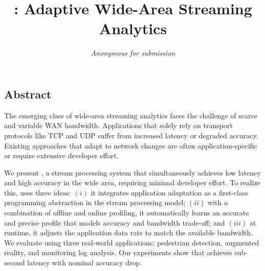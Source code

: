 \documentclass[twocolumn, 9pt]{article}
\begin{document}
\date{}



\title{\sysname{}: Adaptive Wide-Area Streaming Analytics}

\author{
  \textit{Anonymous for submission}
}

\maketitle

\subsection*{Abstract}
  The emerging class of wide-area streaming analytics faces the challenge of
  scarce and variable WAN bandwidth. Applications that solely rely on
  transport protocols like TCP and UDP suffer from increased latency or degraded
  accuracy. Existing approaches that adapt to network changes are often
  application-specific or require extensive developer effort.

  We present \sysname{}, a stream processing system that simultaneously achieves
  low latency and high accuracy in the wide area, requiring minimal developer
  effort. To realize this, \sysname{} uses three ideas: $(i)$ it integrates
  application adaptation as a first-class programming abstraction in the stream
  processing model; $(ii)$ with a combination of offline and online profiling,
  it automatically learns an accurate and precise profile that models accuracy and
  bandwidth trade-off; and $(iii)$ at runtime, it adjusts the application data rate
  to match the available bandwidth. We evaluate \sysname{} using three
  real-world applications: pedestrian detection, augmented reality, and
  monitoring log analysis. Our experiments show that \sysname{} achieves
  sub-second latency with nominal accuracy drop.










% 

{\footnotesize 
}
\end{document}
